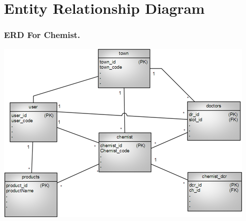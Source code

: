 \label{fig:Use case diagram For Other User}



%




\section{Entity Relationship Diagram}

\subsubsection{ERD For Chemist.}
\includegraphics[scale=0.7]{Diag/ERDchemist.png}
\label{abc}

